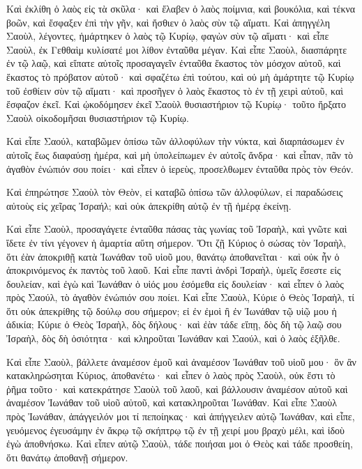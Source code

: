 {Καὶ ἐκλίθη ὁ λαὸς εἰς τὰ σκῦλα· καὶ ἔλαβεν ὁ λαὸς ποίμνια, καὶ βουκόλια, καὶ τέκνα βοῶν, καὶ ἔσφαξεν ἐπὶ τὴν γῆν, καὶ ἤσθιεν ὁ λαὸς σὺν τῷ αἵματι.
Καὶ ἀπηγγέλη Σαοὺλ, λέγοντες, ἡμάρτηκεν ὁ λαὸς τῷ Κυρίῳ, φαγὼν σὺν τῷ αἵματι· καὶ εἶπε Σαοὺλ, ἐκ Γεθθαὶμ κυλίσατέ μοι λίθον ἐνταῦθα μέγαν.
Καὶ εἶπε Σαοὺλ, διασπάρητε ἐν τῷ λαῷ, καὶ εἴπατε αὐτοῖς προσαγαγεῖν ἐνταῦθα ἕκαστος τὸν μόσχον αὑτοῦ, καὶ ἕκαστος τὸ πρόβατον αὑτοῦ· καὶ σφαζέτω ἐπὶ τούτου, καὶ οὐ μὴ ἁμάρτητε τῷ Κυρίῳ τοῦ ἐσθίειν σὺν τῷ αἵματι· καὶ προσῆγεν ὁ λαὸς ἕκαστος τὸ ἐν τῇ χειρὶ αὐτοῦ, καὶ ἔσφαζον ἐκεῖ.
Καὶ ᾠκοδόμησεν ἐκεῖ Σαοὺλ θυσιαστήριον τῷ Κυρίῳ· τοῦτο ἤρξατο Σαοὺλ οἰκοδομῆσαι θυσιαστήριον τῷ Κυρίῳ.
\par }{\PP {}Καὶ εἶπε Σαούλ, καταβῶμεν ὀπίσω τῶν ἀλλοφύλων τὴν νύκτα, καὶ διαρπάσωμεν ἐν αὐτοῖς ἕως διαφαύσῃ ἡμέρα, καὶ μὴ ὑπολείπωμεν ἐν αὐτοῖς ἄνδρα· καὶ εἶπαν, πᾶν τὸ ἀγαθὸν ἐνώπιόν σου ποίει· καὶ εἶπεν ὁ ἱερεὺς, προσελθωμεν ἐνταῦθα πρὸς τὸν Θεόν.
\par }{\PP {}Καὶ ἐπηρώτησε Σαοὺλ τὸν Θεὸν, εἰ καταβῶ ὀπίσω τῶν ἀλλοφύλων, εἰ παραδώσεις αὐτοὺς εἰς χεῖρας Ἰσραήλ; καὶ οὐκ ἀπεκρίθη αὐτῷ ἐν τῇ ἡμέρᾳ ἐκείνῃ.
\par }{\PP {}Καὶ εἶπε Σαοὺλ, προσαγάγετε ἐνταῦθα πάσας τὰς γωνίας τοῦ Ἰσραὴλ, καὶ γνῶτε καὶ ἴδετε ἐν τίνι γέγονεν ἡ ἁμαρτία αὕτη σήμερον.
Ὅτι ζῇ Κύριος ὁ σώσας τὸν Ἰσραὴλ, ὅτι ἐὰν ἀποκριθῇ κατὰ Ἰωνάθαν τοῦ υἱοῦ μου, θανάτῳ ἀποθανεῖται· καὶ οὐκ ἦν ὁ ἀποκρινόμενος ἐκ παντὸς τοῦ λαοῦ.
Καὶ εἶπε παντὶ ἀνδρὶ Ἰσραὴλ, ὑμεῖς ἔσεστε εἰς δουλείαν, καὶ ἐγὼ καὶ Ἰωνάθαν ὁ υἱός μου ἐσόμεθα εἰς δουλείαν· καὶ εἶπεν ὁ λαὸς πρὸς Σαούλ, τὸ ἀγαθὸν ἐνώπιόν σου ποίει.
Καὶ εἶπε Σαοὺλ, Κύριε ὁ Θεὸς Ἰσραὴλ, τί ὅτι οὐκ ἀπεκρίθης τῷ δούλῳ σου σήμερον; εἰ ἐν ἐμοὶ ἢ ἐν Ἰωνάθαν τῷ υἱῷ μου ἡ ἀδικία; Κύριε ὁ Θεὸς Ἰσραὴλ, δὸς δήλους· καὶ ἐὰν τάδε εἴπῃ, δὸς δὴ τῷ λαῷ σου Ἰσραὴλ, δὸς δὴ ὁσιότητα· καὶ κληροῦται Ἰωνάθαν καὶ Σαούλ, καὶ ὁ λαὸς ἐξῆλθε.
\par }{\PP {}Καὶ εἶπε Σαοὺλ, βάλλετε ἀναμέσον ἐμοῦ καὶ ἀναμέσον Ἰωνάθαν τοῦ υἱοῦ μου· ὃν ἂν κατακληρώσηται Κύριος, ἀποθανέτω· καὶ εἶπεν ὁ λαὸς πρὸς Σαοὺλ, οὐκ ἔστι τὸ ῥῆμα τοῦτο· καὶ κατεκράτησε Σαοὺλ τοῦ λαοῦ, καὶ βάλλουσιν ἀναμέσον αὐτοῦ καὶ ἀναμέσον Ἰωνάθαν τοῦ υἱοῦ αὐτοῦ, καὶ κατακληροῦται Ἰωνάθαν.
Καὶ εἶπε Σαοὺλ πρὸς Ἰωνάθαν, ἀπάγγειλόν μοι τί πεποίηκας· καὶ ἀπήγγειλεν αὐτῷ Ἰωνάθαν, καὶ εἶπε, γευόμενος ἐγευσάμην ἐν ἄκρῳ τῷ σκήπτρῳ τῷ ἐν τῇ χειρί μου βραχὺ μέλι, καὶ ἰδοὺ ἐγὼ ἀποθνήσκω.
Καὶ εἶπεν αὐτῷ Σαοὺλ, τάδε ποιήσαι μοι ὁ Θεὸς καὶ τάδε προσθείη, ὅτι θανάτῳ ἀποθανῇ σήμερον.
}
